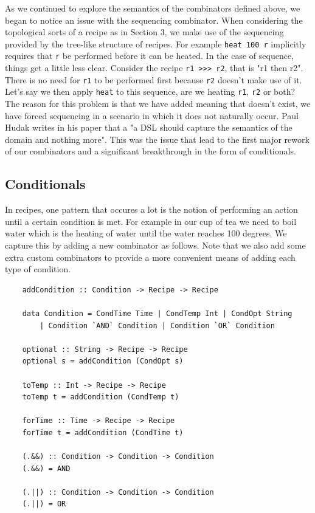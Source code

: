 \documentclass[11pt]{article}
\begin{document}
As we continued to explore the semantics of the combinators defined above, we began to
notice an issue with the sequencing combinator. When considering the topological sorts
of a recipe as in Section 3, we make use of the sequencing provided by the tree-like structure
of recipes. For example \texttt{heat 100 r} implicitly requires that \texttt{r} be performed
before it can be heated. In the case of sequence, things get a little less clear. Consider
the recipe \texttt{r1 >>> r2}, that is "r1 then r2". There is no need for \texttt{r1} to be
performed first because \texttt{r2} doesn't make use of it. Let's say we then apply \texttt{heat}
to this sequence, are we heating \texttt{r1}, \texttt{r2} or both? The reason for this problem
is that we have added meaning that doesn't exist, we have forced sequencing in a scenario
in which it does not naturally occur. Paul Hudak writes in his paper \cite{hudak} that a
"a DSL should capture the semantics of the domain and nothing more". This was the issue
that lead to the first major rework of our combinators and a significant breakthrough
in the form of conditionals.

\subsection{Conditionals}

In recipes, one pattern that occures a lot is the notion of performing an action until
a certain condition is met. For example in our cup of tea we need to boil water which is
the heating of water until the water reaches 100 degrees. We capture this by adding a new
combinator as follows. Note that we also add some extra custom combinators to provide
a more convenient means of adding each type of condition.

\begin{lstlisting}
    addCondition :: Condition -> Recipe -> Recipe

    data Condition = CondTime Time | CondTemp Int | CondOpt String
        | Condition `AND` Condition | Condition `OR` Condition

    optional :: String -> Recipe -> Recipe
    optional s = addCondition (CondOpt s)

    toTemp :: Int -> Recipe -> Recipe
    toTemp t = addCondition (CondTemp t)

    forTime :: Time -> Recipe -> Recipe
    forTime t = addCondition (CondTime t)

    (.&&) :: Condition -> Condition -> Condition
    (.&&) = AND

    (.||) :: Condition -> Condition -> Condition
    (.||) = OR
\end{lstlisting}
\end{document}
